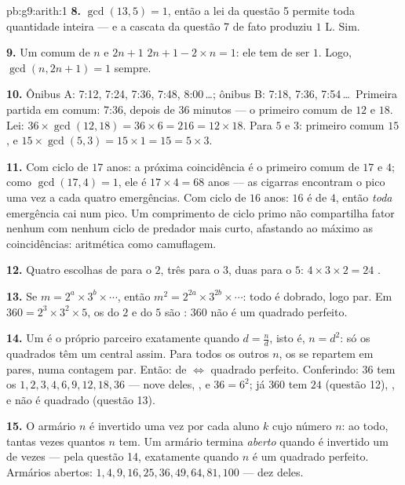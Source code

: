 \begin{solution}{pb:g9:arith:1}
\textbf{8.} $\gcd(13, 5) = 1$, então a lei da questão 5 permite toda
quantidade inteira --- e a cascata da questão 7 de fato produziu $1$ L.
Sim.

\textbf{9.} Um  comum de $n$ e $2n + 1$ 
$2n + 1 - 2 \times n = 1$: ele tem de ser $1$. Logo,
$\gcd(n, 2n+1) = 1$ sempre.

\textbf{10.} Ônibus A: 7:12, 7:24, 7:36, 7:48, 8:00\,\dots; ônibus B:
7:18, 7:36, 7:54\,\dots\ Primeira partida em comum: 7:36, depois de
$36$ minutos --- o primeiro  comum de $12$ e $18$. Lei:
$36 \times \gcd(12, 18) = 36 \times 6 = 216 = 12 \times 18$. Para $5$ e
$3$: primeiro  comum $15$, e
$15 \times \gcd(5,3) = 15 \times 1 = 15 = 5 \times 3$.

\textbf{11.} Com ciclo de $17$ anos: a próxima coincidência é o
primeiro  comum de $17$ e $4$; como $\gcd(17, 4) = 1$, ele é
$17 \times 4 = 68$ anos --- as cigarras encontram o pico uma vez a cada
quatro emergências. Com ciclo de $16$ anos: $16$ é  de $4$,
então \emph{toda} emergência cai num pico. Um comprimento de ciclo
primo não compartilha fator nenhum com nenhum ciclo de predador mais
curto, afastando ao máximo as coincidências: aritmética como camuflagem.

\textbf{12.} Quatro escolhas de  para o $2$, três para o $3$,
duas para o $5$: $4 \times 3 \times 2 = 24$ .

\textbf{13.} Se $m = 2^{a} \times 3^{b} \times \cdots$, então
$m^2 = 2^{2a} \times 3^{2b} \times \cdots$: todo  é dobrado,
logo par. Em $360 = 2^3 \times 3^2 \times 5$, os  do $2$ e do
$5$ são : $360$ não é um quadrado perfeito.

\textbf{14.} Um  é o próprio parceiro exatamente quando
$d = \frac nd$, isto é, $n = d^2$: só os quadrados têm um 
central assim. Para todos os outros $n$, os  se repartem em
pares, numa contagem par. Então:  de 
$\Leftrightarrow$ quadrado perfeito. Conferindo: $36$ tem os 
$1, 2, 3, 4, 6, 9, 12, 18, 36$ --- nove deles, , e
$36 = 6^2$; já $360$ tem $24$ (questão 12), , e não é
quadrado (questão 13).

\textbf{15.} O armário $n$ é invertido uma vez por cada aluno $k$ cujo
número  $n$: ao todo, tantas vezes quantos  $n$ tem. Um
armário termina \emph{aberto} quando é invertido um  de
vezes --- pela questão 14, exatamente quando $n$ é um quadrado
perfeito. Armários abertos: $1, 4, 9, 16, 25, 36, 49, 64, 81, 100$ ---
dez deles.
\end{solution}
